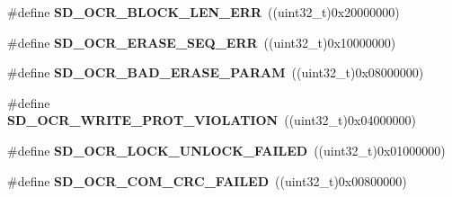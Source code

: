 \begin{DoxyCompactItemize}
\item 
\#define {\bfseries S\+D\+\_\+\+O\+C\+R\+\_\+\+B\+L\+O\+C\+K\+\_\+\+L\+E\+N\+\_\+\+E\+RR}~((uint32\+\_\+t)0x20000000)\hypertarget{group___s_t_m324x_g___e_v_a_l___s_d_i_o___s_d___private___defines_gad528da3ef5cf61ecf6d500a9b527c3e9}{}\label{group___s_t_m324x_g___e_v_a_l___s_d_i_o___s_d___private___defines_gad528da3ef5cf61ecf6d500a9b527c3e9}

\item 
\#define {\bfseries S\+D\+\_\+\+O\+C\+R\+\_\+\+E\+R\+A\+S\+E\+\_\+\+S\+E\+Q\+\_\+\+E\+RR}~((uint32\+\_\+t)0x10000000)\hypertarget{group___s_t_m324x_g___e_v_a_l___s_d_i_o___s_d___private___defines_ga749b810615490fcf173d5355a6f42075}{}\label{group___s_t_m324x_g___e_v_a_l___s_d_i_o___s_d___private___defines_ga749b810615490fcf173d5355a6f42075}

\item 
\#define {\bfseries S\+D\+\_\+\+O\+C\+R\+\_\+\+B\+A\+D\+\_\+\+E\+R\+A\+S\+E\+\_\+\+P\+A\+R\+AM}~((uint32\+\_\+t)0x08000000)\hypertarget{group___s_t_m324x_g___e_v_a_l___s_d_i_o___s_d___private___defines_gadbeb08085e7282275fd5684b5d59d5aa}{}\label{group___s_t_m324x_g___e_v_a_l___s_d_i_o___s_d___private___defines_gadbeb08085e7282275fd5684b5d59d5aa}

\item 
\#define {\bfseries S\+D\+\_\+\+O\+C\+R\+\_\+\+W\+R\+I\+T\+E\+\_\+\+P\+R\+O\+T\+\_\+\+V\+I\+O\+L\+A\+T\+I\+ON}~((uint32\+\_\+t)0x04000000)\hypertarget{group___s_t_m324x_g___e_v_a_l___s_d_i_o___s_d___private___defines_gabe0162775c8357aa31263ec2225bd123}{}\label{group___s_t_m324x_g___e_v_a_l___s_d_i_o___s_d___private___defines_gabe0162775c8357aa31263ec2225bd123}

\item 
\#define {\bfseries S\+D\+\_\+\+O\+C\+R\+\_\+\+L\+O\+C\+K\+\_\+\+U\+N\+L\+O\+C\+K\+\_\+\+F\+A\+I\+L\+ED}~((uint32\+\_\+t)0x01000000)\hypertarget{group___s_t_m324x_g___e_v_a_l___s_d_i_o___s_d___private___defines_gac9a82e52cc83dd23035bc0fdd9a88cf4}{}\label{group___s_t_m324x_g___e_v_a_l___s_d_i_o___s_d___private___defines_gac9a82e52cc83dd23035bc0fdd9a88cf4}

\item 
\#define {\bfseries S\+D\+\_\+\+O\+C\+R\+\_\+\+C\+O\+M\+\_\+\+C\+R\+C\+\_\+\+F\+A\+I\+L\+ED}~((uint32\+\_\+t)0x00800000)\hypertarget{group___s_t_m324x_g___e_v_a_l___s_d_i_o___s_d___private___defines_ga75c4da9e9ca6b935c3afb213dda9c7d0}{}\label{group___s_t_m324x_g___e_v_a_l___s_d_i_o___s_d___private___defines_ga75c4da9e9ca6b935c3afb213dda9c7d0}


\end{DoxyCompactItemize}
